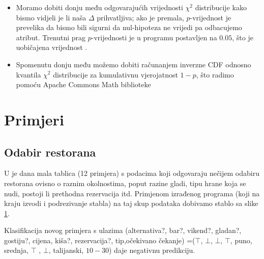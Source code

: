\documentclass{beamer}
\begin{document}
\begin{frame}
    \begin{itemize}
\item Moramo dobiti donju među odgovarajućih vrijednosti $\chi^2$ distribucije kako bismo vidjeli je li 
naša $\Delta$ prihvatljiva; ako je premala, $p$-vrijednost je prevelika da bismo bili sigurni da nul-hipoteza ne vrijedi pa odbacujemo atribut.
Trenutni prag $p$-vrijednosti je u programu postavljen na $0.05$, što je uobičajena vrijednost \cite{rn}.
\item Spomenutu donju među možemo dobiti računanjem
inverzne CDF odnosno kvantila $\chi^2$ distribucije za kumulativnu vjerojatnost $1-p$, što radimo pomoću Apache Commons Math biblioteke
\end{itemize}
\end{frame}

\section{Primjeri}
\subsection{Odabir restorana}
\begin{frame}
U \cite{rn} je dana mala tablica (12 primjera) s podacima koji odgovaraju nečijem odabiru restorana ovisno o raznim okolnostima, poput 
razine gladi, tipu hrane koja se nudi, postoji li prethodna rezervacija itd. Primjenom izrađenog programa (koji na kraju 
izvodi i podrezivanje stabla) na taj skup podataka dobivamo stablo sa slike \ref{restaurants}.
\begin{figure} \label{restaurants}
    \end{figure}

\end{frame}
\begin{frame}
    Klasifikacija novog primjera s ulazima (alternativa?, bar?, vikend?, gladan?, gostiju?, cijena, kiša?, rezervacija?, tip,očekivano čekanje)
    =($\top$, $\bot$, $\bot$, $\top$, puno, srednja, $\top$ , $\bot$, talijanski, $10-30$) daje negativnu predikciju.
    
\end{frame}
\end{document}
